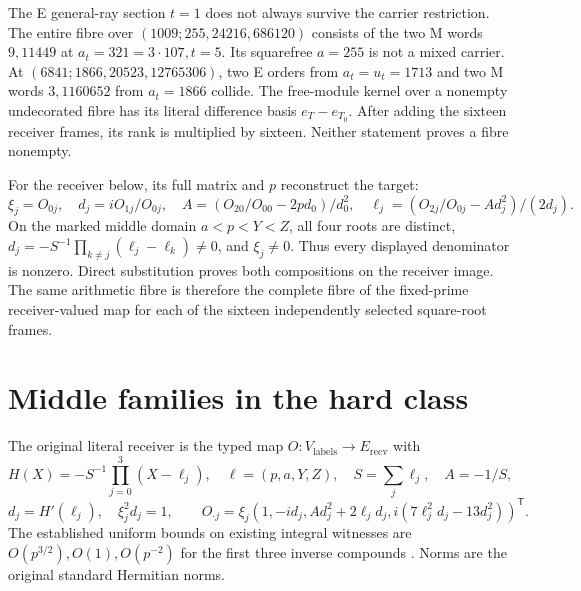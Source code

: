 \documentclass[10pt,reqno]{amsart}
\begin{document}
The E general-ray section $t=1$ does not always survive the carrier
restriction. The entire fibre over $(1009;255,24216,686120)$ consists of the
two M words $9,11449$ at $a_t=321=3\cdot107,t=5$. Its squarefree $a=255$
is not a mixed carrier. At $(6841;1866,20523,12765306)$, two E orders from
$a_t=u_t=1713$ and two M words $3,1160652$ from $a_t=1866$ collide.
The free-module kernel over a nonempty undecorated fibre has its literal
difference basis $e_T-e_{T_0}$. After adding the sixteen receiver frames, its
rank is multiplied by sixteen. Neither statement proves a fibre nonempty.



For the receiver below, its full matrix and $p$ reconstruct the target:
\[
 \xi_j=O_{0j},\quad d_j=iO_{1j}/O_{0j},\quad
 A=(O_{20}/O_{00}-2pd_0)/d_0^2,\quad
 \ell_j=(O_{2j}/O_{0j}-Ad_j^2)/(2d_j).
\]
On the marked middle domain $a<p<Y<Z$, all four roots are distinct,
$d_j=-S^{-1}\prod_{k\ne j}(\ell_j-\ell_k)\ne0$, and $\xi_j\ne0$.
Thus every displayed denominator is nonzero. Direct substitution proves both
compositions on the receiver image. The same arithmetic fibre is therefore
the complete fibre of the fixed-prime receiver-valued map for each of the
sixteen independently selected square-root frames.

\section{Middle families in the hard class}
The original literal receiver is the typed map
$O:V_{\mathrm{labels}}\to E_{\mathrm{recv}}$ with
\[
 H(X)=-S^{-1}\prod_{j=0}^3(X-\ell_j),\quad
 \ell=(p,a,Y,Z),\quad S=\sum_j\ell_j,\quad A=-1/S,
\]
\[
 d_j=H'(\ell_j),\quad\xi_j^2d_j=1,\qquad
 O_{\cdot j}=\xi_j(1,-id_j,Ad_j^2+2\ell_jd_j,
 i(7\ell_j^2d_j-13d_j^2))^{\mathsf T}.
\]
The established uniform bounds on existing integral witnesses are
$O(p^{3/2}),O(1),O(p^{-2})$ for the first three inverse compounds
\citep[Theorem 1.1]{Sharp}. Norms are the original standard Hermitian norms.
\end{document}
